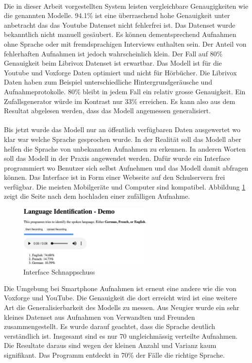 \\
Die in dieser Arbeit vorgestellten System leisten vergleichbare Genaugigkeiten wie die genannten Modelle. 94.1\% ist eine überraschend hohe Genauigkeit unter anbetracht das das Youtube Datenset nicht fehlerfrei ist. Das Datenset wurde bekanntlich nicht manuell gesäubert. Es können dementsprechend Aufnahmen ohne Sprache oder mit fremdsprachigen Interviews enthalten sein. Der Anteil von fehlerhaften Aufnahmen ist jedoch wahrscheinlich klein. 
Der Fall auf 80\% Genauigkeit beim Librivox Datenset ist erwartbar. Das Modell ist für die Youtube und Voxforge Daten optimiert und nicht für Hörbücher. Die Librivox Daten haben zum Beispiel unterschiedliche Hintergrundgeräusche und Aufnahmeprotokolle. 80\% bleibt in jedem Fall ein relativ grosse Genauigkeit. Ein Zufallsgenerator würde im Kontrast nur 33\% erreichen. Es kann also aus dem Resultat abgelesen werden, dass das Modell angemessen generalisiert. 
\\ \\
Bis jetzt wurde das Modell nur an öffentlich verfügbaren Daten ausgewertet wo klar war welche Sprache gesprochen wurde. In der Realität soll das Modell aber helfen die Sprache von unbekannten Aufnahmen zu erkennen. In anderen Worten soll das Modell in der Praxis angewendet werden. Dafür wurde ein Interface programmiert wo Benutzer sich selbst Aufnehmen und das Modell damit abfragen können. Das Interface ist in Form einer Webseite auf den Schulservern frei verfügbar. Die meisten Mobilgeräte und Computer sind kompatibel. Abbildung \ref{img:interface} zeigt die Seite nach dem hochladen einer zufälligen Aufnahme.
\begin{figure}[hbt]
	\centering
		\includegraphics[width=0.6\textwidth]{assets/interface.png}
	\caption{Interface Schnappschuss}
	\label{img:interface}
\end{figure}
Die Umgebung bei Smartphone Aufnahmen ist erneut eine andere wie die von Voxforge und YouTube. Die Genauigkeit die dort erreicht wird ist eine weitere Art die Generalisierbarkeit des Modells zu messen. Aus Neugier wurde ein sehr kleines Datenset aus Aufnahmen von Verwandten und Freunden zusammengestellt. Es wurde darauf geachtet, dass die Sprache deutlich verständlich ist. Insgesamt sind es nur 70 ungleichmässig verteilte Aufnahmen. Die Resultate daraus sind wegen der kleinen Anzahl und Varianz kaum signifikant. Das Programm entdeckt in 70\% der Fälle die richtige Sprache. 
